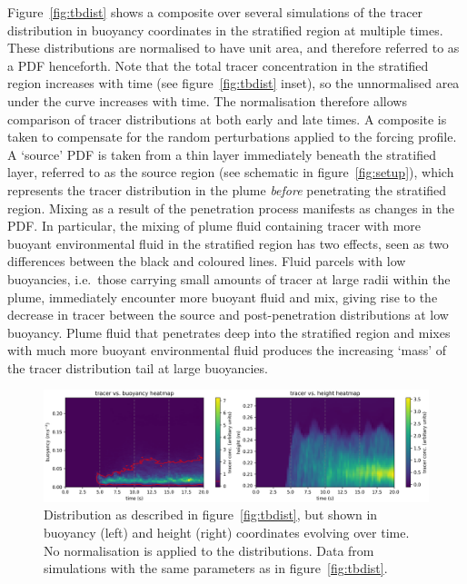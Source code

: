 \documentclass[a4paper]{article}
\begin{document}
Figure~\ref{fig:tbdist} shows a composite over several simulations of the tracer distribution in buoyancy
coordinates in the stratified region at multiple times.  These distributions are normalised to have unit area,
and therefore referred to as a PDF henceforth. Note that the total tracer concentration in the stratified
region increases with time (see figure~\ref{fig:tbdist} inset), so the unnormalised area under the curve
increases with time. The normalisation therefore allows comparison of tracer distributions at both early and
late times.  A composite is taken to compensate for the random perturbations applied to the forcing profile. A
`source' PDF is taken from a thin layer immediately beneath the stratified layer, referred to as the source
region (see schematic in figure~\ref{fig:setup}), which represents the tracer distribution in the plume
\emph{before} penetrating the stratified region.  Mixing as a result of the penetration process manifests as
changes in the PDF. In particular, the mixing of plume fluid containing tracer with more buoyant environmental
fluid in the stratified region has two effects, seen as two differences between the black and coloured lines.
Fluid parcels with low buoyancies, i.e.\ those carrying small amounts of tracer at large radii within the
plume, immediately encounter more buoyant fluid and mix, giving rise to the decrease in tracer between the
source and post-penetration distributions at low buoyancy. Plume fluid that penetrates deep into the
stratified region and mixes with much more buoyant environmental fluid produces the increasing `mass' of the
tracer distribution tail at large buoyancies.

\begin{figure}
	\centering
	\includegraphics[width=\textwidth]{hmap}
	\caption{Distribution as described in figure~\ref{fig:tbdist}, but shown in buoyancy (left) and height
		(right) coordinates evolving over time. No normalisation is applied to the distributions. Data from
		simulations with the same parameters as in figure~\ref{fig:tbdist}.} 
	\label{fig:hmap}
\end{figure}
\end{document}
